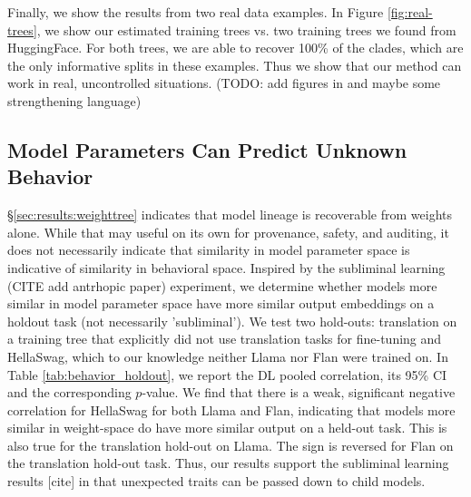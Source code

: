 \documentclass{article}
\theoremstyle{definition}
\theoremstyle{plain}
\begin{document}
Finally, we show the results from two real data examples.  In Figure \ref{fig:real-trees}, we show our estimated training trees vs. two training trees we found from HuggingFace.  For both trees, we are able to recover 100\% of the clades, which are the only informative splits in these examples.  Thus we show that our method can work in real, uncontrolled situations.  (TODO: add figures in and maybe some strengthening language)


\subsection{Model Parameters Can Predict Unknown Behavior}
\label{sec:results:behavioral}

\S \ref{sec:results:weighttree} indicates that model lineage is recoverable from weights alone.  While that may useful on its own for provenance, safety, and auditing, it does not necessarily indicate that similarity in model parameter space is indicative of similarity in behavioral space.  Inspired by the subliminal learning (CITE add antrhopic paper) experiment, we determine whether models more similar in model parameter space have more similar output embeddings on a holdout task (not necessarily 'subliminal').  We test two hold-outs: translation on a training tree that explicitly did not use translation tasks for fine-tuning and HellaSwag, which to our knowledge neither Llama nor Flan were trained on.  In Table \ref{tab:behavior_holdout}, we report the DL pooled correlation, its 95\% CI and the corresponding $p$-value.  We find that there is a weak, significant negative correlation for HellaSwag for both Llama and Flan, indicating that models more similar in weight-space do have more similar output on a held-out task.  This is also true for the translation hold-out on Llama.  The sign is reversed for Flan on the translation hold-out task.  Thus, our results support the subliminal learning results [cite] in that unexpected traits can be passed down to child models.
\end{document}
